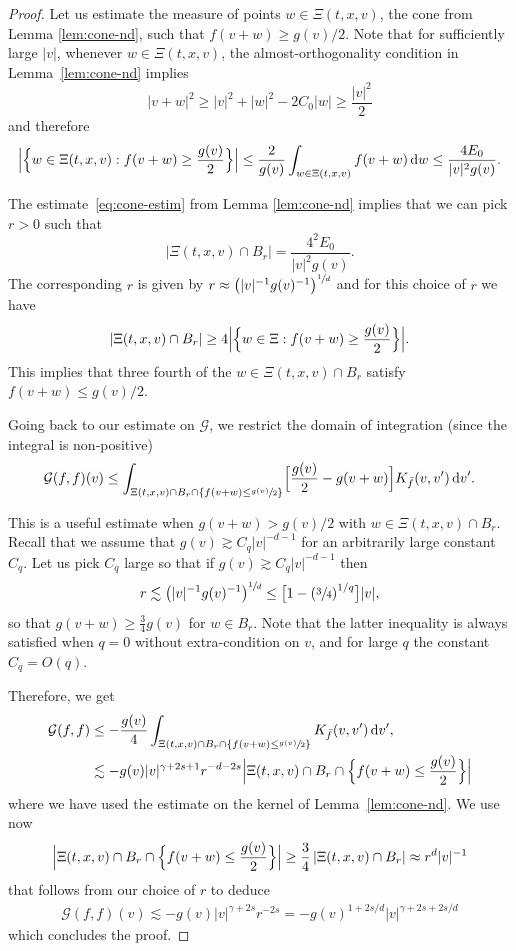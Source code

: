 \documentclass[11pt]{article}
\theoremstyle{plain}
\theoremstyle{definition}
\numberwithin{equation}{section}
\newcommand{\dd} {\, \mathrm{d}}
\begin{document}
\begin{proof}
Let us estimate the measure of points $w \in \Xi(t,x,v)$, the cone
from Lemma \ref{lem:cone-nd}, such that $f(v+w) \ge g(v)/2$. Note that
for sufficiently large $|v|$, whenever $w \in \Xi(t,x,v)$, the
almost-orthogonality condition in Lemma~\ref{lem:cone-nd} implies
\[
|v+w|^2 \geq |v|^2 + |w|^2 - 2 C_0|w| \geq \frac{|v|^2}{2}
\]
and therefore
\[
\Bigl|\Bigl\{ w \in \Xi(t,x,v) : f(v+w) \ge \frac{g(v)}{2} \Bigr\}\Bigr|
\le \frac2{g(v)} \int_{w \in \Xi(t,x,v)} f(v+w) \dd w \le \frac{4E_0}{|v|^2
g(v)}.
\]

The estimate~\eqref{eq:cone-estim} from Lemma \ref{lem:cone-nd}
implies that we can pick $r>0$ such that
\[
\left|\Xi(t,x,v) \cap B_r \right| = \frac{4^2E_0}{|v|^2 g(v)}.
\]
The corresponding $r$ is given by
$r \approx \left(|v|^{-1} g(v)^{-1}\right)^{\sfrac1d}$ and for this
choice of $r$ we have
\[
\left|\Xi(t,x,v) \cap B_r \right| \ge 4 \Bigl|\Bigl\{ w \in \Xi: f(v+w)
\ge \frac{g(v)}{2} \Bigr\}\Bigr|.
\]
This implies that three fourth of the $w \in \Xi(t,x,v) \cap B_r$ satisfy
$f(v+w) \le g(v)/2$.

Going back to our estimate on $\mathcal G$, we restrict the domain of
integration (since the integral is non-positive)
\[
\mathcal G(f,f)(v) \leq \int_{\Xi(t,x,v) \cap B_r \cap \left\{f(v+w) \le \sfrac{g(v)}{2}\right\}}
\Bigl[ \frac{g(v)}{2} - g(v+w) \Bigr] K_{\bar f}(v,v') \dd v'.
\]

This is a useful estimate when $g(v+w) > g(v)/2$ with
$w \in \Xi(t,x,v) \cap B_r$. Recall that we assume that
$g(v) \gtrsim C_q |v|^{-d-1}$ for an arbitrarily large constant
$C_q$. Let us pick $C_q$ large so that if
$g(v) \gtrsim C_q |v|^{-d-1}$ then
\[
r \lesssim \left(|v|^{-1} g(v)^{-1}\right)^{\sfrac1d} \leq \bigl[ 1-
\left( \sfrac{3}{4} \right)^{1/q} \bigr] |v|,
\]
so that $g(v+w) \geq \frac{3}{4} g(v)$ for $w \in B_r$. Note that the
latter inequality is always satisfied when $q=0$ without
extra-condition on $v$, and for large $q$ the constant $C_q=O(q)$.

Therefore, we get
\begin{align*}
\mathcal G(f,f)
&\leq -\frac{g(v)} 4 \int_{\Xi(t,x,v) \cap B_r \cap \left\{f(v+w) \le \sfrac{g(v)}{2}\right\}} K_{\bar f}(v,v') \dd v', \\
&\lesssim -g(v) |v|^{\gamma+2s+1} r^{-d-2s} \Bigl|\Xi(t,x,v) \cap B_r \cap
\Bigl\{f(v+w) \le \frac{g(v)}{2}\Bigr\}\Bigr|
\end{align*}
where we have used the estimate on the kernel of
Lemma~\ref{lem:cone-nd}. We use now
\[
\Bigl|\Xi(t,x,v) \cap B_r \cap \Bigl\{f(v+w) \le \frac{g(v)}{2} \Bigr\}\Bigr| \ge \frac34\, |\Xi(t,x,v) \cap
B_r| \approx r^d |v|^{-1}
\]
that follows from our choice of $r$ to deduce
\begin{align*}
\mathcal G(f,f)(v) \lesssim -g(v) |v|^{\gamma+2s} r^{-2s} =
- g(v)^{1+2s/d} |v|^{\gamma+2s+2s/d}
\end{align*}
which concludes the proof.
\end{proof}
\end{document}
